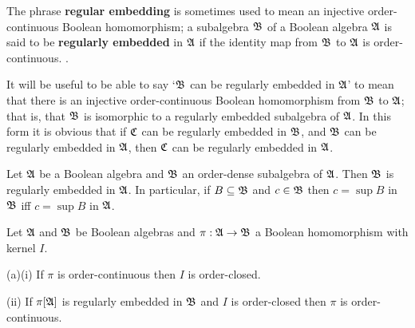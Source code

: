  The phrase {\bf regular embedding} is
sometimes
used to mean an injective order-continuous Boolean homomorphism;  a
subalgebra $\frak B$ of a Boolean algebra $\frak A$ is said to be
{\bf regularly embedded} in $\frak A$ if the identity map from $\frak B$
to $\frak A$ is order-continuous.   .

It will be useful to be able to say `$\frak B$ can be regularly embedded
in $\frak A$' to mean that there is an injective order-continuous
Boolean homomorphism from $\frak B$ to $\frak A$;  that is, that
$\frak B$ is isomorphic to a regularly embedded subalgebra of $\frak A$.
In this form it is obvious that if $\frak C$ can be
regularly embedded in $\frak B$, and $\frak B$ can be regularly embedded
in $\frak A$, then $\frak C$ can be regularly embedded in $\frak A$.

 Let $\frak A$ be a Boolean algebra and
$\frak B$ an order-dense subalgebra of $\frak A$.   Then $\frak B$ is
regularly
embedded in $\frak A$.   In particular, if $B\subseteq\frak B$ and
$c\in\frak B$ then $c=\sup B$ in $\frak B$ iff $c=\sup B$ in $\frak A$.


 Let $\frak A$ and $\frak B$ be Boolean algebras
and $\pi:\frak A\to\frak B$ a Boolean homomorphism
with kernel $I$.

(a)(i) If $\pi$ is order-continuous then $I$ is order-closed.

\quad(ii) If $\pi[\frak A]$ is regularly embedded in $\frak B$ and $I$
is order-closed then $\pi$ is order-continuous.

